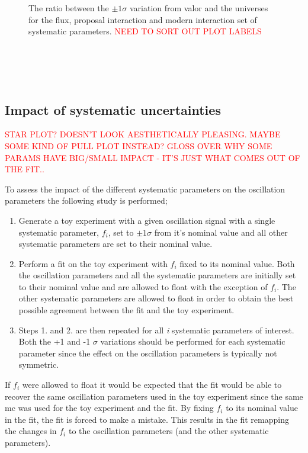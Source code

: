 \begin{figure}[h!]
  \captionsetup{width=0.49\textwidth}
  \parbox[b]{0.49\textwidth}%
  {
   \caption[The ratio between the $\pm 1 \sigma$ variation from \gls{valor} and the universes for the flux, proposal interaction and modern interaction set of systematics.]{The ratio between the $\pm 1 \sigma$ variation from \gls{valor} and the universes for the flux, proposal interaction and modern interaction set of systematic parameters. \textcolor{red}{NEED TO SORT OUT PLOT LABELS} \\\\\\\\\\}
   \label{fig:1sigma_variations_toys}}
\end{figure}

\subsection{Impact of systematic uncertainties}

\textcolor{red}{STAR PLOT? DOESN'T LOOK AESTHETICALLY PLEASING. MAYBE SOME KIND OF PULL PLOT INSTEAD? GLOSS OVER WHY SOME PARAMS HAVE BIG/SMALL IMPACT - IT'S JUST WHAT COMES OUT OF THE FIT..}

To assess the impact of the different systematic parameters on the oscillation parameters the following study is performed;
\begin{enumerate}
    \item Generate a toy experiment with a given oscillation signal with a single systematic parameter, $f_i$, set to $\pm 1\sigma$ from it's nominal value and all other systematic parameters are set to their nominal value.
    \item Perform a fit on the toy experiment with $f_i$ fixed to its nominal value. Both the oscillation parameters and all the systematic parameters are initially set to their nominal value and are allowed to float with the exception of $f_i$. The other systematic parameters are allowed to float in order to obtain the best possible agreement between the fit and the toy experiment.
    \item Steps 1. and 2. are then repeated for all \textit{i} systematic parameters of interest. Both the +1 and -1 $\sigma$ variations should be performed for each systematic parameter since the effect on the oscillation parameters is typically not symmetric.  
\end{enumerate}
If $f_i$ were allowed to float it would be expected that the fit would be able to recover the same oscillation parameters used in the toy experiment since the same \gls{mc} was used for the toy experiment and the fit. By fixing $f_i$ to its nominal value in the fit, the fit is forced to make a mistake. This results in the fit remapping the changes in $f_i$ to the oscillation parameters (and the other systematic parameters). 

